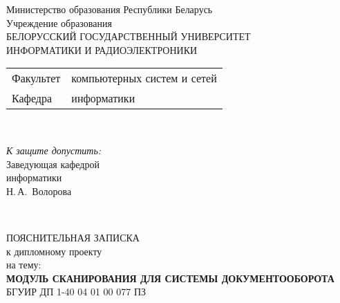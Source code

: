 \begin{titlepage}
  \begin{center}
    Министерство образования Республики Беларусь\\[1em]
    Учреждение образования\\
    БЕЛОРУССКИЙ ГОСУДАРСТВЕННЫЙ УНИВЕРСИТЕТ \\
    ИНФОРМАТИКИ И РАДИОЭЛЕКТРОНИКИ\\[1em]

    \begin{minipage}{\textwidth}
      \begin{flushleft}
        \begin{tabular}{ l l }
          Факультет & компьютерных систем и сетей\\
          Кафедра   & информатики
        \end{tabular}
      \end{flushleft}
    \end{minipage}\\[1em]

    \begin{flushright}
      \begin{minipage}{0.4\textwidth}
        \textit{К защите допустить:}\\[0.8em]
        Заведующая кафедрой \\ информатики\\[0.45em]
        \underline{\hspace*{2.8cm}} Н.\,А.~Волорова
      \end{minipage}\\[2.2em]
    \end{flushright}

    {ПОЯСНИТЕЛЬНАЯ ЗАПИСКА}\\
    {к дипломному проекту}\\
    {на тему:}\\[1em]
    \textbf{\large \MakeUppercase{
    МОДУЛЬ СКАНИРОВАНИЯ ДЛЯ СИСТЕМЫ ДОКУМЕНТООБОРОТА}}\\[1em]


    {БГУИР ДП 1-40 04 01 00 077 ПЗ}\\[2em]
    

\end{center}
\end{titlepage}
